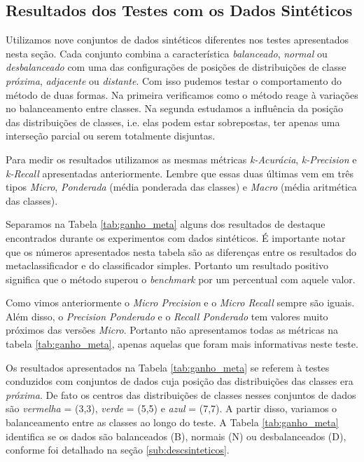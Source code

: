 \subsection{Resultados dos Testes com os Dados Sintéticos}

Utilizamos nove conjuntos de dados sintéticos diferentes nos testes apresentados nesta seção.
Cada conjunto combina a característica \textit{balanceado}, \textit{normal} ou \textit{ desbalanceado} com uma das configurações de posições de distribuições de classe \textit{próxima}, \textit{adjacente} ou \textit{distante}.
Com isso pudemos testar o comportamento do método de duas formas.
Na primeira verificamos como o método reage à variações no balanceamento entre classes.
Na segunda estudamos a influência da posição das distribuições de classes, i.e. elas podem estar sobrepostas, ter apenas uma interseção parcial ou serem totalmente disjuntas.

Para medir os resultados utilizamos as mesmas métricas \textit{k-Acurácia}, \textit{k-Precision} e \textit{k-Recall} apresentadas anteriormente.
Lembre que essas duas últimas vem em três tipos \textit{Micro}, \textit{Ponderada} (média ponderada das classes) e \textit{Macro} (média aritmética das classes).

Separamos na Tabela \ref{tab:ganho_meta} alguns dos resultados de destaque encontrados durante os experimentos com dados sintéticos.
É importante notar que os números apresentados nesta tabela são as diferenças entre os resultados do metaclassificador e do classificador simples.
Portanto um resultado positivo significa que o método superou o \textit{benchmark} por um percentual com aquele valor.

Como vimos anteriormente o \textit{Micro Precision} e o \textit{Micro Recall} sempre são iguais.
Além disso, o \textit{Precision Ponderado} e o \textit{Recall Ponderado} tem valores muito próximos das versões \textit{Micro}.
Portanto não apresentamos todas as métricas na tabela \ref{tab:ganho_meta}, apenas aquelas que foram mais informativas neste teste.

Os resultados apresentados na Tabela \ref{tab:ganho_meta} se referem à testes conduzidos com conjuntos de dados cuja posição das distribuições das classes era \textit{próxima}.
De fato os centros das distribuições de classes nesses conjuntos de dados são \textit{vermelha} = (3,3), \textit{verde} = (5,5) e \textit{azul} = (7,7).
A partir disso, variamos o balanceamento entre as classes ao longo do teste.
A Tabela \ref{tab:ganho_meta} identifica se os dados são balanceados (B), normais (N) ou desbalanceados (D), conforme foi detalhado na seção \ref{sub:descsinteticos}.


